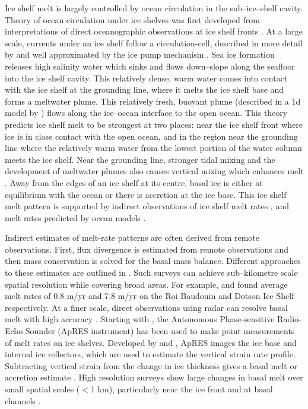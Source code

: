 Ice shelf melt is largely controlled by ocean circulation in the sub--ice--shelf cavity. Theory of ocean circulation under ice shelves was first developed from interpretations of direct oceanographic observations at ice shelf fronts \cite [e.g.][] {jacobs1979circulation}.
At a large scale, currents under an ice shelf follow a circulation-cell, described in more detail by \cite{jacobs1992melting} and well approximated by the ice pump mechanism \citep{lewis1986ice}.
Sea ice formation releases high salinity water which sinks and flows down--slope along the seafloor into the ice shelf cavity. This relatively dense, warm water comes into contact with the ice shelf at the grounding line, where it melts the ice shelf base and forms a meltwater plume. This relatively fresh, buoyant plume (described in a 1d model by \cite{jenkins1991one}) flows along the ice--ocean interface to the open ocean. 
This theory predicts ice shelf melt to be strongest at two places: near the ice shelf front where ice is in close contact with the open ocean, and in the region near the grounding line where the relatively warm water from the lowest portion of the water column meets the ice shelf. Near the grounding line, stronger tidal mixing and the development of meltwater plumes also causes vertical mixing which enhances melt \citep{macayeal1984thermohaline, macayeal1985evolution}. Away from the edges of an ice shelf at its centre, basal ice is either at equilibrium with the ocean or there is accretion at the ice base. This ice shelf melt pattern is supported by indirect observations of ice shelf melt rates \cite [e.g.][] {rignot2013ice, mankoff2012role,goldberg2019accurately}, and melt rates predicted by ocean models \cite [e.g.][] {goldberg2019accurately}.

Indirect estimates of melt-rate patterns are often derived from remote observations. First, flux divergence is estimated from remote observations and then mass conservation is solved for the basal mass balance. Different approaches to these estimates are outlined in \cite{berger2017detecting}. Such surveys can achieve sub--kilometre scale spatial resolution while covering broad areas. For example, \cite {berger2017detecting} and \cite{gourmelen2017channelized} found average melt rates of 0.8 m/yr and 7.8 m/yr on the Roi Baudouin and Dotson Ice Shelf respectively.
At a finer scale, direct observations using radar can resolve basal melt with high accuracy \cite [e.g.][] {vavnkova2020observations,young2018resolving}. Starting with \cite{corr2002precise}, the Autonomous Phase-sensitive Radio-Echo Sounder (ApRES instrument) has been used to make point measurements of melt rates on ice shelves. Developed by \cite{brennan2014phase} and \cite{nicholls2015ground}, ApRES images the ice base and internal ice reflectors, which are used to estimate the vertical strain rate profile. Subtracting vertical strain from the change in ice thickness gives a basal melt or accretion estimate \citep{brennan2014phase}. 
High resolution surveys show large changes in basal melt over small spatial scales ($<$1 km), particularly near the ice front \cite [e.g.][] {stewart2019basal} and at basal channels \cite [e.g.][] {stanton2013channelized, dutrieux2014basal,marsh2016high}.


